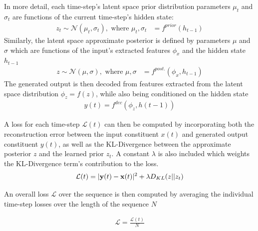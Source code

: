 \documentclass[12pt, a4paper]{article}
\begin{document}
In more detail, each time-step's latent space prior distribution parameters $\mu_{t}$ and $\sigma_{t}$ are functions of the current time-step's hidden state:
\begin{align*}
z_{t} \sim \mathcal{N}(\mu_{t}, \sigma_{t}), \text{ where } \mu_{t}, \sigma_{t} &= f^{prior}(h_{t-1})
\end{align*} 
Similarly, the latent space approximate posterior is defined by parameters $\mu$ and $\sigma$ which are functions of the input's extracted features $\phi_{x}$ and the hidden state $h_{t-1}$
\begin{align*}
z \sim \mathcal{N}(\mu, \sigma), \text{ where } \mu, \sigma &= f^{post.}(\phi_{x}, h_{t-1})
\end{align*} 
The generated output is then decoded from features extracted from the latent space distribution $\phi_{z} = f(z)$, while also being conditioned on the hidden state
\begin{align*}
y(t) = f^{dec}(\phi_{z}, h(t-1))
\end{align*} 

A loss for each time-step $\mathcal{L}(t)$ can then be computed by incorporating both the reconstruction error between the input constituent $x(t)$ and generated output constituent $y(t)$, as well as the KL-Divergence between the approximate posterior $z$ and the learned prior $z_{t}$. A constant $\lambda$ is also included which weights the KL-Divergence term's contribution to the loss. 
\begin{align*}
\mathcal{L}(t) = |{\bf y}(t) - {\bf x}(t)|^{2} + \lambda D_{KL}(z||z_{t})
\end{align*} 

An overall loss $\mathcal{L}$ over the sequence is then computed by averaging the individual time-step losses over the length of the sequence $N$

\begin{align*}
\mathcal{L} = \frac{\mathcal{L}(t)}{N}
\end{align*} 
\end{document}

